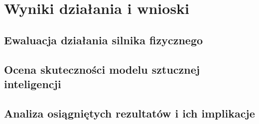 \chapter{Wyniki działania i wnioski}
\section{Ewaluacja działania silnika fizycznego}
\section{Ocena skuteczności modelu sztucznej inteligencji}
\section{Analiza osiągniętych rezultatów i ich implikacje}